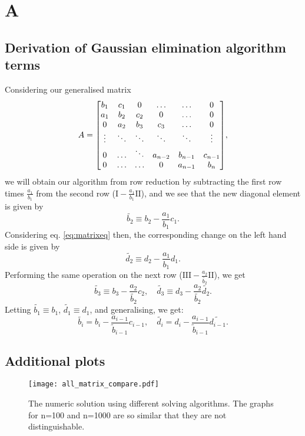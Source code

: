 \onecolumn
\setcounter{equation}{0}
\renewcommand\theequation{A.\arabic{equation}}
\section*{A}
\label{sec:appendix}

\subsection*{Derivation of Gaussian elimination algorithm terms}
\label{sec:derivgauss}
Considering our generalised matrix
  \[A =
    \mqty[b_1 & c_1 & 0 & \hdots & \hdots & 0 \\
          a_1 & b_2 & c_2 & 0 & \hdots & 0 \\
          0 & a_2 & b_3 & c_3 & \hdots & 0 \\
          \vdots & \ddots & \ddots & \ddots & \ddots & \vdots \\
          0 & \hdots & \ddots & a_{n-2} & b_{n-1} & c_{n-1} \\
          0 & \hdots & \hdots & 0 & a_{n-1} & b_n],
  \]
we will obtain our algorithm from row reduction by subtracting the first row
times $\frac{a_1}{b_1}$ from the second row ($\text{I} - \frac{a_1}{b_1}\text{II}
$), and we see that the new diagonal element is given by
  \[\widetilde{b_2} \equiv b_2 - \frac{a_1}{b_1}c_1.\]
Considering eq. \ref{eq:matrixeq} then, the corresponding change on the left
hand side is given by
  \[\widetilde{d_2} \equiv d_2 - \frac{a_1}{b_1}d_1.\]
Performing the same operation on the next row
($\text{III} - \frac{a_2}{\widetilde{b_2}}\text{II}$), we get
  \[\widetilde{b_3} \equiv b_3 - \frac{a_2}{\widetilde{b_2}}c_2, \quad
  \widetilde{d_3} \equiv d_3 - \frac{a_2}{\widetilde{b_2}}\widetilde{d_2}.
  \]
Letting $\widetilde{b_1} \equiv b_1$, $\widetilde{d_1} \equiv d_1$, and
generalising, we get:
  \[
    \widetilde{b_i} = b_i - \frac{a_{i-1}}{\widetilde{b}_{i-1}}c_{i-1}, \quad
    \widetilde{d_i} = d_i - \frac{a_{i-1}}{\widetilde{b}_{i-1}}\widetilde{d_{i-1}}.
  \]

\subsection*{Additional plots}

\begin{figure}[htbp]
	\centering
	\texttt{[image: all\_matrix\_compare.pdf]}
	\caption{The numeric solution using different solving algorithms. The graphs for n=100 and n=1000 are so similar that they are not distinguishable.}
	\label{fig:all}
\end{figure}
